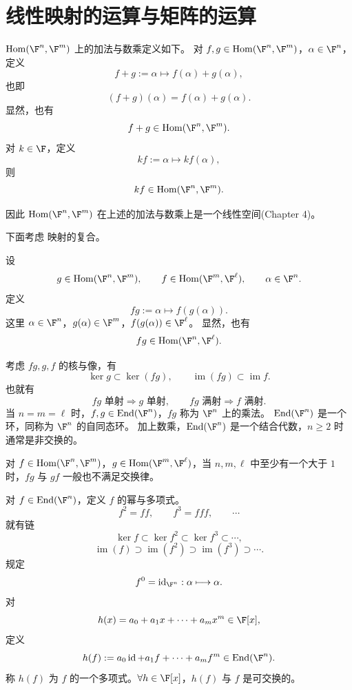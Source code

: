 \section{线性映射的运算与矩阵的运算}

\begin{definition}\label{p1:concept:c3-l300}
	$\operatorname{Hom}(\F^n,\F^m)$ 上的加法与数乘定义如下。
	对 $f,g\in\operatorname{Hom}(\F^n,\F^m)$，$\alpha\in\F^n$，定义
	\[
	f+g:=\alpha\longmapsto f(\alpha)+g(\alpha),
	\]
	也即
	\[
	(f+g)(\alpha)=f(\alpha)+g(\alpha).
	\]
	显然，也有
	\[
	f+g\in\operatorname{Hom}(\F^n,\F^m).
	\]
	对 $k\in\F$，定义
	\[
	kf:=\alpha\longmapsto kf(\alpha),
	\]
	则
	\[
	kf\in\operatorname{Hom}(\F^n,\F^m).
	\]
	
\end{definition}
因此 $\operatorname{Hom}(\F^n,\F^m)$ 在上述的加法与数乘上是一个线性空间(Chapter 4)。

下面考虑
映射的复合。
\begin{definition}\label{p1:concept:c3-l328}
	设
	\[
	g\in\operatorname{Hom}(\F^n,\F^m),\qquad
	f\in\operatorname{Hom}(\F^m,\F^\ell),\qquad
	\alpha\in\F^n.
	\]
	定义
	\[
	fg:=\alpha\longmapsto f(g(\alpha)).
	\]
	这里 $\alpha\in\F^n$，$g(\alpha)\in\F^m$，$f(g(\alpha))\in\F^\ell$。
	显然，也有
	\[
	fg\in\operatorname{Hom}(\F^n,\F^\ell).
	\]
	
\end{definition}
考虑 $fg,g,f$ 的核与像，有
\[
\ker g\subset \ker(fg),
\qquad
\operatorname{im}(fg)\subset \operatorname{im}f.
\]
也就有
\[
fg\text{ 单射}\Rightarrow g\text{ 单射},
\qquad
fg\text{ 满射}\Rightarrow f\text{ 满射}.
\]
当 $n=m=\ell$ 时，$f,g\in\operatorname{End}(\F^n)$，$fg$ 称为 $\F^n$ 上的乘法。
\label{p1:concept:c3-l359}$\operatorname{End}(\F^n)$ 是一个环，同称为 $\F^n$ 的自同态环。
加上数乘，$\operatorname{End}(\F^n)$ 是一个结合代数，$n\geq 2$ 时通常是非交换的。

对 $f\in\operatorname{Hom}(\F^n,\F^m)$，$g\in\operatorname{Hom}(\F^m,\F^\ell)$，当 $n,m,\ell$ 中至少有一个大于 $1$ 时，$fg$ 与 $gf$ 一般也不满足交换律。
\begin{definition}\label{p1:concept:c3-l363}
	对 $f\in\operatorname{End}(\F^n)$，定义 $f$ 的幂与多项式。
	\[
	f^2=ff,
	\qquad
	f^3=fff,
	\qquad \cdots
	\]
	就有链
	\[
	\ker f\subset \ker f^2\subset \ker f^3\subset\cdots,
	\]
	\[
	\operatorname{im}(f)\supset \operatorname{im}(f^2)\supset \operatorname{im}(f^3)\supset\cdots.
	\]
	规定
	\[
	f^0=\operatorname{id}_{\F^n}:\alpha\longmapsto \alpha.
	\]
	对
	\[
	h(x)=a_0+a_1x+\cdots+a_mx^m\in\F[x],
	\]
	定义
	\[
	h(f):=a_0\operatorname{id}+a_1f+\cdots+a_mf^m\in\operatorname{End}(\F^n).
	\]
	称 $h(f)$ 为 $f$ 的一个多项式。$\forall h\in\F[x]$，$h(f)$ 与 $f$ 是可交换的。
\end{definition}

